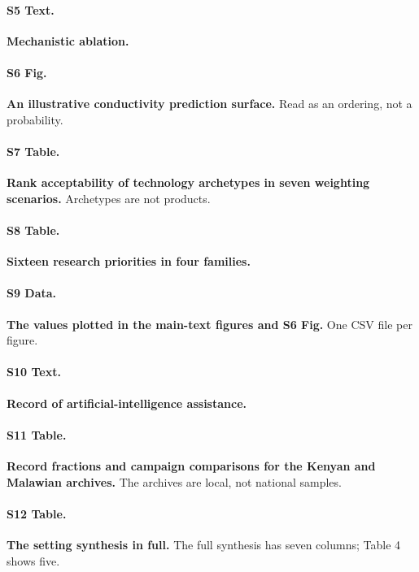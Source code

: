 \documentclass[10pt,letterpaper]{article}
\begin{document}
\paragraph*{S5 Text.}
\label{S5_Text}
\textbf{Mechanistic ablation.}

\paragraph*{S6 Fig.}
\label{S6_Fig}
\textbf{An illustrative conductivity prediction surface.} Read as an ordering, not a probability.

\paragraph*{S7 Table.}
\label{S7_Table}
\textbf{Rank acceptability of technology archetypes in seven weighting scenarios.} Archetypes are not products.

\paragraph*{S8 Table.}
\label{S8_Table}
\textbf{Sixteen research priorities in four families.}

\paragraph*{S9 Data.}
\label{S9_Data}
\textbf{The values plotted in the main-text figures and S6 Fig.} One CSV file per figure.

\paragraph*{S10 Text.}
\label{S10_Text}
\textbf{Record of artificial-intelligence assistance.}

\paragraph*{S11 Table.}
\label{S11_Table}
\textbf{Record fractions and campaign comparisons for the Kenyan and Malawian archives.} The archives are local, not national samples.

\paragraph*{S12 Table.}
\label{S12_Table}
\textbf{The setting synthesis in full.} The full synthesis has seven columns; Table 4 shows five.
\end{document}
